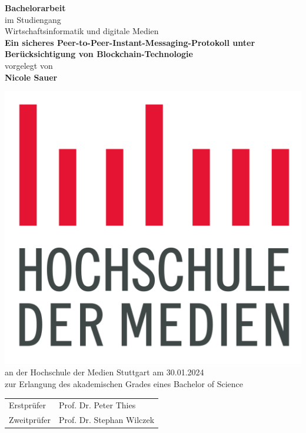 \documentclass[12pt, a4paper]{report}
\begin{document}
    \begin{titlepage}
        \begin{center}
            
            \vspace*{1cm}
            \LARGE
            \textbf{Bachelorarbeit}\\

            \Large
            \bigbreak
            im Studiengang \\
            Wirtschaftsinformatik und digitale Medien\\

            \vspace*{1cm}
            \LARGE
            \textbf{Ein sicheres Peer-to-Peer-Instant-Messaging-Protokoll unter
            Berücksichtigung von Blockchain-Technologie}\\
            
            \large
            \vspace*{1cm}
            vorgelegt von \\
            \vspace*{0.5cm}
            \textbf{Nicole Sauer} \\
            \vspace*{1cm}

            \includegraphics[width=0.2\linewidth]{images/hdm_logo.png} \\

            \vspace*{0.5cm}
            an der Hochschule der Medien Stuttgart am 30.01.2024 \\
            zur Erlangung des akademischen Grades eines Bachelor of Science \\
            \vspace*{2cm}
            \large 
            \begin{tabular}{ll}
                Erstprüfer & Prof. Dr. Peter Thies \\
                Zweitprüfer & Prof. Dr. Stephan Wilczek \\
            \end{tabular} \\
        \end{center}
    \end{titlepage}
    
\end{document}
